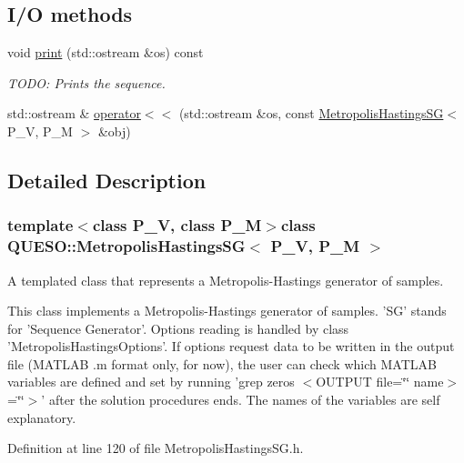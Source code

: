 \subsection*{I/\-O methods}
\begin{DoxyCompactItemize}
\item 
void \hyperlink{class_q_u_e_s_o_1_1_metropolis_hastings_s_g_aed301deea1c0eab1a7d9e4a332729141}{print} (std\-::ostream \&os) const 
\begin{DoxyCompactList}\small\item\em T\-O\-D\-O\-: Prints the sequence. \end{DoxyCompactList}\item 
std\-::ostream \& \hyperlink{class_q_u_e_s_o_1_1_metropolis_hastings_s_g_ab930e71442c0c1e3b8236f2f975c0664}{operator$<$$<$} (std\-::ostream \&os, const \hyperlink{class_q_u_e_s_o_1_1_metropolis_hastings_s_g}{Metropolis\-Hastings\-S\-G}$<$ P\-\_\-\-V, P\-\_\-\-M $>$ \&obj)
\end{DoxyCompactItemize}


\subsection{Detailed Description}
\subsubsection*{template$<$class P\-\_\-\-V, class P\-\_\-\-M$>$class Q\-U\-E\-S\-O\-::\-Metropolis\-Hastings\-S\-G$<$ P\-\_\-\-V, P\-\_\-\-M $>$}

A templated class that represents a Metropolis-\/\-Hastings generator of samples. 

This class implements a Metropolis-\/\-Hastings generator of samples. 'S\-G' stands for 'Sequence Generator'. Options reading is handled by class 'Metropolis\-Hastings\-Options'. If options request data to be written in the output file (M\-A\-T\-L\-A\-B .m format only, for now), the user can check which M\-A\-T\-L\-A\-B variables are defined and set by running 'grep zeros $<$\-O\-U\-T\-P\-U\-T file=\char`\"{}\char`\"{} name$>$=\char`\"{}\char`\"{}$>$' after the solution procedures ends. The names of the variables are self explanatory. 

Definition at line 120 of file Metropolis\-Hastings\-S\-G.\-h.



